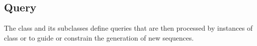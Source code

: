 \documentclass[letterpaper,10pt,english]{sphinxmanual}
\begin{document}
\begin{fulllineitems}
\begin{fulllineitems}
\begin{sphinxVerbatim}[commandchars=\\\{\}]
           
\end{sphinxVerbatim}

\end{fulllineitems}


\end{fulllineitems}



\chapter{}
\label{\detokenize{index:handle-generation}}\label{\detokenize{index:module-Query}}

\section{Query}
\label{\detokenize{index:query}}
The class {\hyperref[\detokenize{index:Query.Query}]{}} and its subclasses define queries that are then processed by instances of class {\hyperref[\detokenize{index:Generator.Generator}]{}} or {\hyperref[\detokenize{index:Generator.GenerationHandler}]{}} to guide or constrain the generation of new sequences.
\end{document}
